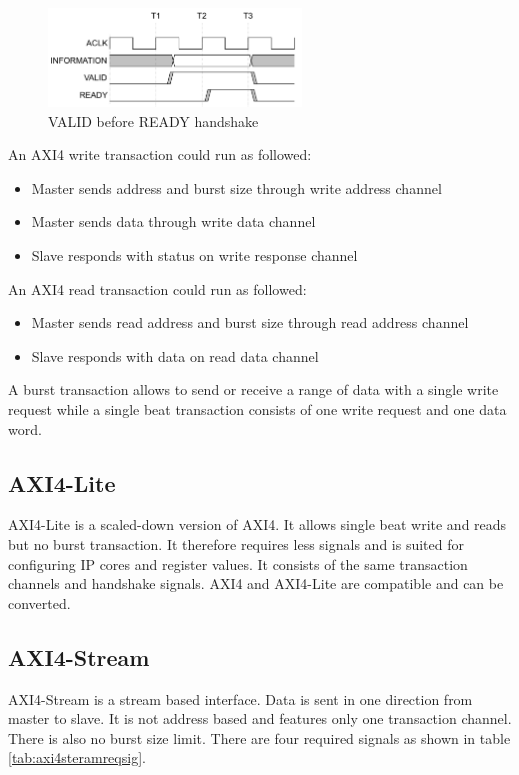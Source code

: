 \begin{figure}[b!]
    \centering
    \includegraphics[width=0.6\textwidth]{images/theory/axi4handshake.png}
    \caption{VALID before READY handshake \cite{axispecs}}
    \label{fig:axihandshake}
\end{figure}

An AXI4 write transaction could run as followed:
\begin{itemize}
    \item Master sends address and burst size through write address channel
    \item Master sends data through write data channel
    \item Slave responds with status on write response channel
\end{itemize}

An AXI4 read transaction could run as followed:
\begin{itemize}
    \item Master sends read address and burst size through read address channel
    \item Slave responds with data on read data channel
\end{itemize}

A burst transaction allows to send or receive a range of data with a single
write
request while a single beat transaction consists of one write request and one
data word.

\subsection{AXI4-Lite}
AXI4-Lite is a scaled-down version of AXI4. It allows single beat write and
reads but no burst transaction. It therefore requires less signals and is suited
for configuring IP cores and register values. It consists of the same
transaction channels and handshake signals. AXI4 and AXI4-Lite are compatible
and can be converted.

\subsection{AXI4-Stream}
AXI4-Stream is a stream based interface. Data is sent in one direction from
master to slave. It is not address based and features only one transaction
channel. There is also no burst size limit. There are four required signals as
shown in table \ref{tab:axi4steramreqsig}.

